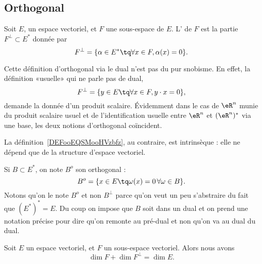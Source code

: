 \subsection{Orthogonal}

\begin{definition}      \label{DEFooEQSMooHVzbfz}
    Soit \( E\), un espace vectoriel, et \( F\) une sous-espace de \( E\). L' de \( F\) est la partie \( F^{\perp}\subset E^*\) donnée par
    \begin{equation}    \label{Eqiiyple}
        F^{\perp}=\{ \alpha\in E^*\tq \forall x\in F,\alpha(x)=0 \}.
    \end{equation}
\end{definition}

Cette définition d'orthogonal via le dual n'est pas du pur snobisme. En effet, la définition «usuelle» qui ne parle pas de dual,
\begin{equation}
    F^{\perp}=\{ y\in E\tq \forall x\in F,y\cdot x=0 \},
\end{equation}
demande la donnée d'un produit scalaire. Évidemment dans le cas de \( \eR^n\) munie du produit scalaire usuel et de l'identification usuelle entre \( \eR^n\) et \( (\eR^n)^*\) via une base, les deux notions d'orthogonal coïncident.

La définition~\ref{DEFooEQSMooHVzbfz}, au contraire, est intrinsèque : elle ne dépend que de la structure d'espace vectoriel.

Si \( B\subset E^*\), on note \( B^o\) son orthogonal :
\begin{equation}
    B^o=\{ x\in E\tq \omega(x)=0\,\forall \omega\in B \}.
\end{equation}
Notons qu'on le note \( B^o\) et non \( B^{\perp}\) parce qu'on veut un peu s'abstraire du fait que \( (E^*)^*=E\). Du coup on impose que \( B\) soit dans un dual et on prend une notation précise pour dire qu'on remonte au pré-dual et non qu'on va au dual du dual.


\begin{proposition} \label{PropXrTDIi}
    Soit \( E\) un espace vectoriel, et \( F\) un sous-espace vectoriel. Alors nous avons
    \begin{equation}
        \dim F+\dim F^{\perp}=\dim E.
    \end{equation}
\end{proposition}

